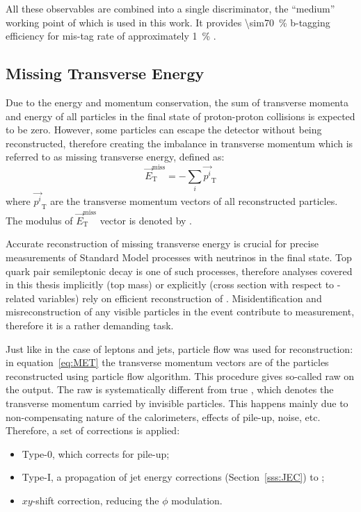 All these observables are combined into a single discriminator, the ``medium'' working point of which is used in this
work. It provides \SI{\sim70}{\percent} b-tagging efficiency for mis-tag rate of approximately \SI{1}{\percent}
\cite{b-tagging_CMS}.

\subsection{Missing Transverse Energy}
\label{ss:MET_reconstruction}
Due to the energy and momentum conservation, the sum of transverse momenta and energy of all particles in the final
state of proton-proton collisions is expected to be zero. However, some particles can escape the detector without being
reconstructed, therefore creating the imbalance in transverse momentum which is referred to as missing transverse
energy, defined as:
\begin{equation}
\label{eq:MET}
\vec{E}_\mathrm{T}^\mathrm{miss} = - \sum_i \vec{p^i}_\mathrm{T}
\end{equation}
where $\vec{p^i}_\mathrm{T}$ are the transverse momentum vectors of all reconstructed particles. The modulus of
$\vec{E}_\mathrm{T}^\mathrm{miss}$ vector is denoted by \MET.

Accurate reconstruction of missing transverse energy is crucial for precise measurements of Standard Model processes
with neutrinos in the final state. Top quark pair semileptonic decay is one of such processes, therefore analyses
covered in this thesis implicitly (top mass) or explicitly (\ttbar cross section with respect to \MET-related variables)
rely on efficient reconstruction of \MET. Misidentification and misreconstruction of any visible particles in the event
contribute to \MET measurement, therefore it is a rather demanding task.

Just like in the case of leptons and jets, particle flow was used for \MET reconstruction: in equation~\ref{eq:MET} the
transverse momentum vectors are of the particles reconstructed using particle flow algorithm. This procedure gives
so-called raw \MET on the output. The raw \MET is systematically different from true \MET, which denotes the transverse
momentum carried by invisible particles. This happens mainly due to non-compensating nature of the calorimeters,
effects of pile-up, noise, etc. Therefore, a set of corrections is applied:
\begin{itemize}
 \item Type-0, which corrects \MET for pile-up;
 \item Type-I, a propagation of jet energy corrections (Section~\ref{sss:JEC}) to \MET;
 \item $xy$-shift correction, reducing the \MET $\phi$ modulation.
\end{itemize}


